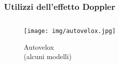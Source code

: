 \documentclass[]{beamer}
\theoremstyle{plain}
\begin{document}
\begin{frame}
  \frametitle{Utilizzi dell'effetto Doppler}
  \begin{columns}
    \begin{column}{0.3\textwidth}
      \begin{figure}
        \texttt{[image: img/autovelox.jpg]}
        
        Autovelox\\(alcuni modelli)
      \end{figure}
    \end{column}
    \begin{column}{0.3\textwidth}
    \end{column}
    \begin{column}{0.3\textwidth}
    \end{column}
  \end{columns}
\end{frame}
\end{document}

